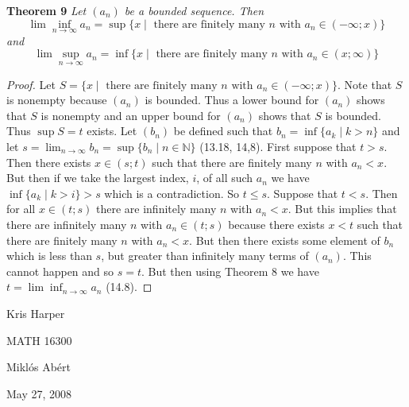\documentclass{article}
\begin{document}
\begin{flushleft}
\textbf{Theorem 9}
\textsl{Let $(a_n)$ be a bounded sequence. Then
\[
\lim \inf_{n \rightarrow \infty} a_n = \sup \{x \mid \text{ there are finitely many $n$ with $a_n \in (-\infty ; x)$} \}
\]
and
\[
\lim \sup_{n \rightarrow \infty} a_n = \inf \{x \mid \text{ there are finitely many $n$ with $a_n \in (x ; \infty)$} \}
\]}
\begin{proof}
Let $S = \{x \mid \text{ there are finitely many $n$ with $a_n \in (-\infty ; x)$} \}$. Note that $S$ is nonempty because $(a_n)$ is bounded. Thus a lower bound for $(a_n)$ shows that $S$ is nonempty and an upper bound for $(a_n)$ shows that $S$ is bounded. Thus $\sup S = t$ exists. Let $(b_n)$ be defined such that $b_n = \inf \{a_k \mid k > n\}$ and let $s = \lim_{n \rightarrow \infty} b_n = \sup \{b_n \mid n \in \mathbb{N}\}$ (13.18, 14,8). First suppose that $t > s$. Then there exists $x \in (s;t)$ such that there are finitely many $n$ with $a_n < x$. But then if we take the largest index, $i$, of all such $a_n$ we have $\inf \{a_k \mid k > i\} > s$ which is a contradiction. So $t \leq s$. Suppose that $t < s$. Then for all $x \in (t;s)$ there are infinitely many $n$ with $a_n < x$. But this implies that there are infinitely many $n$ with $a_n \in (t;s)$ because there exists $x < t$ such that there are finitely many $n$ with $a_n < x$. But then there exists some element of $b_n$ which is less than $s$, but greater than infinitely many terms of $(a_n)$. This cannot happen and so $s=t$. But then using Theorem 8 we have $t = \lim \inf_{n \rightarrow \infty} a_n$ (14.8).
\end{proof}

\end{flushleft}

\newpage

\begin{flushright}
Kris Harper

MATH 16300

Mikl\'{o}s Ab\'{e}rt

May 27, 2008
\end{flushright}
\end{document}
